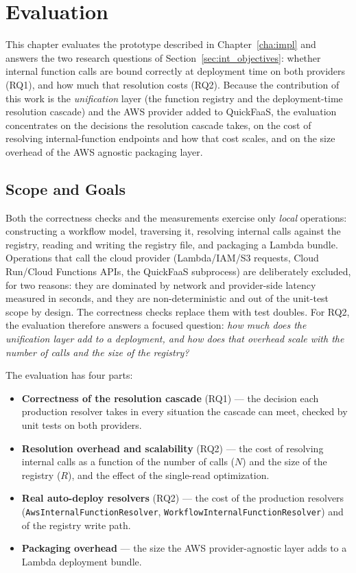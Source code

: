 \chapter{Evaluation}
\label{cha:evaluation}

This chapter evaluates the prototype described in Chapter~\ref{cha:impl} and answers the two
research questions of Section~\ref{sec:int_objectives}: whether internal function calls are bound
correctly at deployment time on both providers (RQ1), and how much that resolution costs (RQ2).
Because the contribution of this work is the \emph{unification} layer (the function registry and
the deployment-time resolution cascade) and the AWS provider added to QuickFaaS, the evaluation
concentrates on the decisions the resolution cascade takes, on the cost of resolving
internal-function endpoints and how that cost scales, and on the size overhead of the AWS agnostic
packaging layer.

\section{Scope and Goals}
\label{sec:eval-scope}

Both the correctness checks and the measurements exercise only \emph{local} operations:
constructing a workflow model, traversing it, resolving internal calls against the registry,
reading and writing the registry file, and packaging a Lambda bundle. Operations that call the
cloud provider (Lambda/IAM/S3 requests, Cloud Run/Cloud Functions APIs, the QuickFaaS subprocess)
are deliberately excluded, for two reasons: they are dominated by network and provider-side latency
measured in seconds, and they are non-deterministic and out of the unit-test scope by design. The
correctness checks replace them with test doubles. For RQ2, the evaluation therefore answers a
focused question: \emph{how much does the unification layer add to a deployment, and how does that
overhead scale with the number of calls and the size of the registry?}

The evaluation has four parts:
\begin{itemize}
  \item \textbf{Correctness of the resolution cascade} (RQ1) --- the decision each production
  resolver takes in every situation the cascade can meet, checked by unit tests on both providers.
  \item \textbf{Resolution overhead and scalability} (RQ2) --- the cost of resolving internal calls as a
  function of the number of calls ($N$) and the size of the registry ($R$), and the effect of the
  single-read optimization.
  \item \textbf{Real auto-deploy resolvers} (RQ2) --- the cost of the production resolvers
  (\texttt{Aws\allowbreak Internal\allowbreak Function\allowbreak Resolver}, \texttt{Workflow\allowbreak Internal\allowbreak Function\allowbreak Resolver}) and of the
  registry write path.
  \item \textbf{Packaging overhead} --- the size the AWS provider-agnostic layer adds to a Lambda
  deployment bundle.
\end{itemize}

